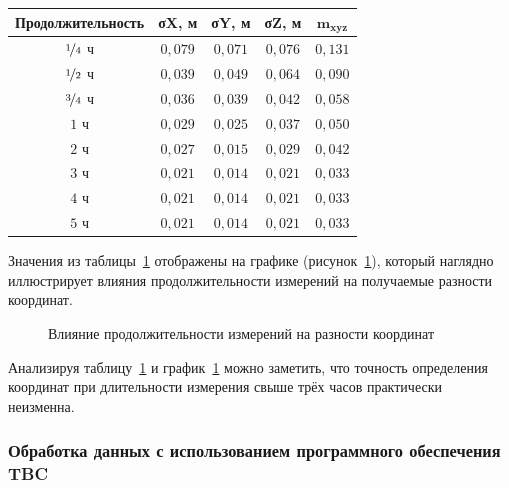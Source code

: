 \begin{table} [htbp]
	\centering\small
	\label{tab:tab15}{%
		\begin{tabular}{|c|c|c|c|c|}
			\hline
			\textbf{Продолжительность} & \textbf{σX, м}   & \textbf{σY, м} & \textbf{σZ, м} & $\mathbf{m_{xyz}}$ \\ \hline
			$\nicefrac{1}{4}$ ч        & $0,079$          & $0,071$        & $0,076$        & $0,131$            \\ \hline
			$\nicefrac{1}{2}$ ч        & $0,039$          & $0,049$        & $0,064$        & $0,090$            \\ \hline
			$\nicefrac{3}{4}$ ч        & $0,036$          & $0,039$        & $0,042$        & $0,058$            \\ \hline
			$1$ ч                      & $0,029$          & $0,025$        & $0,037$        & $0,050$            \\ \hline
			$2$ ч                      & $0,027$          & $0,015$        & $0,029$        & $0,042$            \\ \hline
			$3$ ч                      & $0,021$          & $0,014$        & $0,021$        & $0,033$            \\ \hline
			$4$ ч	                   & $0,021$          & $0,014$        & $0,021$        & $0,033$            \\ \hline
			$5$ ч                      & $0,021$          & $0,014$        & $0,021$        & $0,033$            \\ \hline
		\end{tabular}
	}
\end{table}

Значения из таблицы~\cref{tab:tab15} отображены на графике (рисунок~\cref{fig:pic09}), который наглядно иллюстрирует влияния продолжительности измерений на получаемые разности координат.

\begin{figure}[h]
    \centerfloat{
		
	}
	\caption{Влияние продолжительности измерений на разности координат}\label{fig:pic09}
\end{figure}

Анализируя таблицу~\cref{tab:tab15} и график~\cref{fig:pic09} можно заметить, что точность определения координат при длительности измерения свыше трёх часов практически неизменна.


\subsubsection{Обработка данных с использованием программного обеспечения TBC }\label{subsec:ch2/sec3/sub2/sub2}

